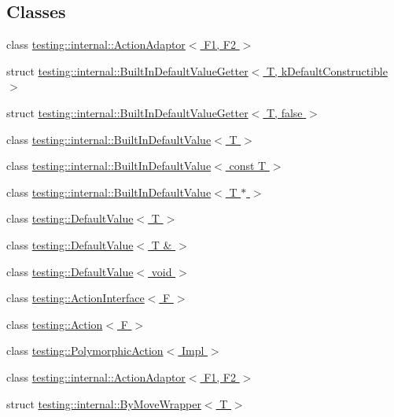 \subsection*{Classes}
\begin{DoxyCompactItemize}
\item 
class \hyperlink{classtesting_1_1internal_1_1ActionAdaptor}{testing\+::internal\+::\+Action\+Adaptor$<$ F1, F2 $>$}
\item 
struct \hyperlink{structtesting_1_1internal_1_1BuiltInDefaultValueGetter}{testing\+::internal\+::\+Built\+In\+Default\+Value\+Getter$<$ T, k\+Default\+Constructible $>$}
\item 
struct \hyperlink{structtesting_1_1internal_1_1BuiltInDefaultValueGetter_3_01T_00_01false_01_4}{testing\+::internal\+::\+Built\+In\+Default\+Value\+Getter$<$ T, false $>$}
\item 
class \hyperlink{classtesting_1_1internal_1_1BuiltInDefaultValue}{testing\+::internal\+::\+Built\+In\+Default\+Value$<$ T $>$}
\item 
class \hyperlink{classtesting_1_1internal_1_1BuiltInDefaultValue_3_01const_01T_01_4}{testing\+::internal\+::\+Built\+In\+Default\+Value$<$ const T $>$}
\item 
class \hyperlink{classtesting_1_1internal_1_1BuiltInDefaultValue_3_01T_01_5_01_4}{testing\+::internal\+::\+Built\+In\+Default\+Value$<$ T $\ast$ $>$}
\item 
class \hyperlink{classtesting_1_1DefaultValue}{testing\+::\+Default\+Value$<$ T $>$}
\item 
class \hyperlink{classtesting_1_1DefaultValue_3_01T_01_6_01_4}{testing\+::\+Default\+Value$<$ T \& $>$}
\item 
class \hyperlink{classtesting_1_1DefaultValue_3_01void_01_4}{testing\+::\+Default\+Value$<$ void $>$}
\item 
class \hyperlink{classtesting_1_1ActionInterface}{testing\+::\+Action\+Interface$<$ F $>$}
\item 
class \hyperlink{classtesting_1_1Action}{testing\+::\+Action$<$ F $>$}
\item 
class \hyperlink{classtesting_1_1PolymorphicAction}{testing\+::\+Polymorphic\+Action$<$ Impl $>$}
\item 
class \hyperlink{classtesting_1_1internal_1_1ActionAdaptor}{testing\+::internal\+::\+Action\+Adaptor$<$ F1, F2 $>$}
\item 
struct \hyperlink{structtesting_1_1internal_1_1ByMoveWrapper}{testing\+::internal\+::\+By\+Move\+Wrapper$<$ T $>$}
\item 

\end{DoxyCompactItemize}
